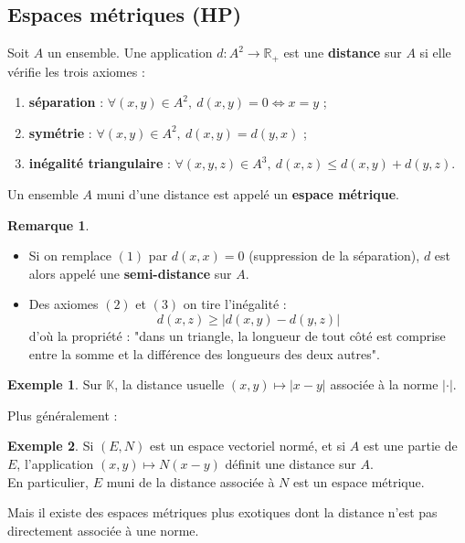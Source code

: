 \documentclass[french]{article}
\newcommand{\R}{\mathbb{R}}
\newcommand{\K}{\mathbb{K}}
\theoremstyle{plain}
\theoremstyle{definition}
\newtheorem*{ex}{Exemple}
\newtheorem*{rmq}{Remarque}
\theoremstyle{remark}
\begin{document}
\subsection{Espaces métriques (HP)}

\begin{dfn}
	Soit $A$ un ensemble. Une application $d:A^2\to\R_+$ est une \textbf{distance} sur $A$ si elle vérifie les trois axiomes :
	\begin{enumerate}[label=(\arabic*)]
		\item \textbf{séparation} : $\forall (x,y)\in A^2,\ d(x,y)=0\iff x=y$ ;
		\item \textbf{symétrie} : $\forall(x,y)\in A^2,\ d(x,y)=d(y,x)$ ;
		\item \textbf{inégalité triangulaire} : $\forall (x,y,z)\in A^3,\ d(x,z)\leqslant d(x,y)+d(y,z)$.
	\end{enumerate}
	Un ensemble $A$ muni d'une distance est appelé un \textbf{espace métrique}.
\end{dfn}

\begin{rmq}
	\begin{itemize}
		\item Si on remplace $(1)$ par $d(x,x)=0$ (suppression de la séparation), $d$ est alors appelé une \textbf{semi-distance} sur $A$.
		\item Des axiomes $(2)$ et $(3)$ on tire l'inégalité : $$d(x,z)\geqslant\lvert d(x,y)-d(y,z)\rvert$$ d'où la propriété : "dans un triangle, la longueur de tout côté est comprise entre la somme et la différence des longueurs des deux autres".
	\end{itemize}
\end{rmq}

\begin{ex}
	Sur $\K$, la distance usuelle $(x,y)\mapsto\lvert x-y\rvert$ associée à la norme $\lvert\cdot\rvert$.
\end{ex}

Plus généralement :

\begin{ex}%
	Si $(E,N)$ est un espace vectoriel normé, et si $A$ est une partie de $E$, l'application $(x,y)\mapsto N(x-y)$ définit une distance sur $A$. \\
	En particulier, $E$ muni de la distance associée à $N$ est un espace métrique.
\end{ex}

Mais il existe des espaces métriques plus exotiques dont la distance n'est pas directement associée à une norme.
\end{document}
